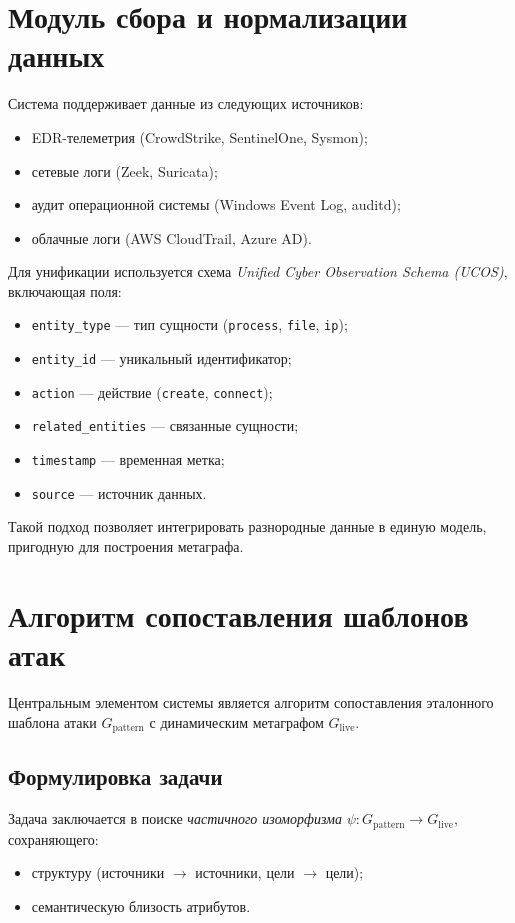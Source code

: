 \section{Модуль сбора и нормализации данных}

Система поддерживает данные из следующих источников:
\begin{itemize}
    \item EDR-телеметрия (CrowdStrike, SentinelOne, Sysmon);
    \item сетевые логи (Zeek, Suricata);
    \item аудит операционной системы (Windows Event Log, auditd);
    \item облачные логи (AWS CloudTrail, Azure AD).
\end{itemize}

Для унификации используется схема \textit{Unified Cyber Observation Schema (UCOS)}, включающая поля:
\begin{itemize}
    \item \texttt{entity\_type} — тип сущности (\texttt{process}, \texttt{file}, \texttt{ip});
    \item \texttt{entity\_id} — уникальный идентификатор;
    \item \texttt{action} — действие (\texttt{create}, \texttt{connect});
    \item \texttt{related\_entities} — связанные сущности;
    \item \texttt{timestamp} — временная метка;
    \item \texttt{source} — источник данных.
\end{itemize}
Такой подход позволяет интегрировать разнородные данные в единую модель, пригодную для построения метаграфа.

\section{Алгоритм сопоставления шаблонов атак}

Центральным элементом системы является алгоритм сопоставления эталонного шаблона атаки $G_{\text{pattern}}$ с динамическим метаграфом $G_{\text{live}}$.

\subsection{Формулировка задачи}

Задача заключается в поиске \textit{частичного изоморфизма} $\psi: G_{\text{pattern}} \rightarrow G_{\text{live}}$, сохраняющего:
\begin{itemize}
    \item структуру (источники $\rightarrow$ источники, цели $\rightarrow$ цели);
    \item семантическую близость атрибутов.
\end{itemize}   
